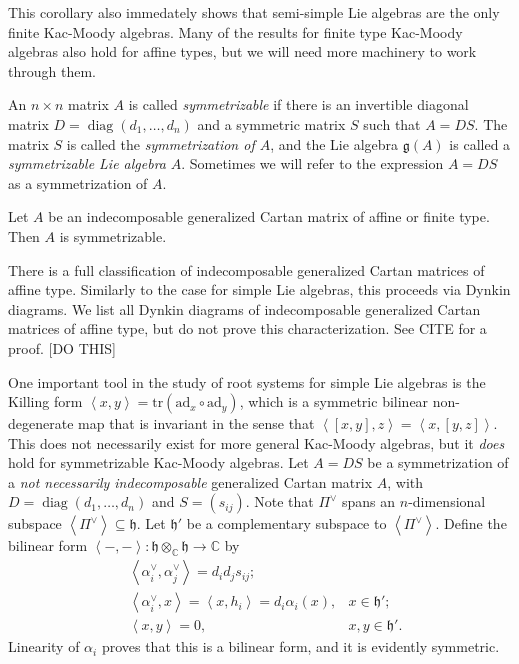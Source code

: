 \documentclass[11pt, letterpaper]{article}
\theoremstyle{plain}
\begin{document}
This corollary also immedately shows that semi-simple Lie algebras are the only finite Kac-Moody algebras. Many of the results for finite type Kac-Moody algebras also hold for affine types,  but we will need more machinery to work through them.

\begin{definition}\label{dfn:4-6}
	An $n\times n$ matrix $A$ is called \emph{symmetrizable} if there is an invertible diagonal matrix $D = \operatorname{diag} (d _1, \ldots ,d_n)$ and a symmetric matrix $S$ such that $A = DS$. The matrix $S$ is called the \emph{symmetrization of $A$}, and the Lie algebra $\mathfrak{g} (A)$ is called a \emph{symmetrizable Lie algebra} $A$. Sometimes we will refer to the expression $A = DS$ as a symmetrization of $A$.
\end{definition}

\begin{proposition}\label{prp:4-7}
	Let $A$ be an indecomposable generalized Cartan matrix of affine or finite type. Then $A$ is symmetrizable.
\end{proposition}

There is a full classification of indecomposable generalized Cartan matrices of affine type. Similarly to the case for simple Lie algebras, this proceeds via Dynkin diagrams. We list all Dynkin diagrams of indecomposable generalized Cartan matrices of affine type, but do not prove this characterization. See CITE for a proof. [DO THIS]



One important tool in the study of root systems for simple Lie algebras is the Killing form $\left\langle x,y \right\rangle  = \mathrm{tr} (\mathrm{ad}_x \circ \mathrm{ad}_y)$, which is a symmetric bilinear non-degenerate map that is invariant in the sense that $\left\langle [x,y],z \right\rangle =\left\langle x,[y,z] \right\rangle $. This does not necessarily exist for more general Kac-Moody algebras, but it \emph{does} hold for symmetrizable Kac-Moody algebras. Let $A = DS$ be a symmetrization of a \emph{not necessarily indecomposable} generalized Cartan matrix $A$, with $D = \operatorname{diag} (d_1, \ldots ,d_n)$ and $S = (s_{ij} )$. Note that $\Pi ^\vee $ spans an $n$-dimensional subspace $\left\langle \Pi ^\vee  \right\rangle \subseteq \mathfrak{h} $. Let $\mathfrak{h} '$ be a complementary subspace to $\left\langle \Pi ^\vee  \right\rangle $. Define the bilinear form $\left\langle -,- \right\rangle : \mathfrak{h} \otimes_\mathbb{C}  \mathfrak{h}  \to \mathbb{C} $ by
\begin{align*}
	&\left\langle \alpha _i^\vee ,\alpha _j^\vee  \right\rangle =d_id_js_{ij};\\
	&\left\langle \alpha_i^\vee ,x \right\rangle =\left\langle x,h_i \right\rangle =d_i\alpha_i(x), & x\in \mathfrak{h} ';\\
	&\left\langle x,y \right\rangle =0, & x,y\in \mathfrak{h} '
.\end{align*}
Linearity of $\alpha _i$ proves that this is a bilinear form, and it is evidently symmetric.
\end{document}
